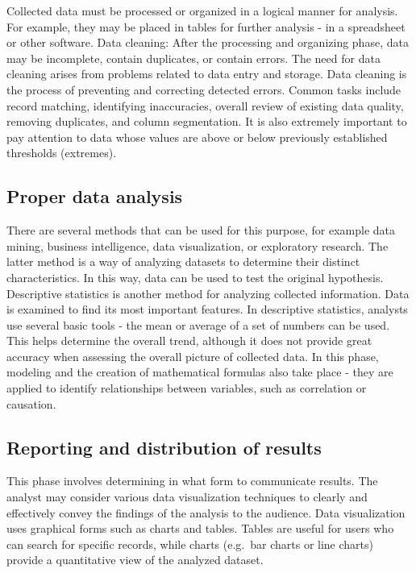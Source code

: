 \documentclass[
  english,
  letterpaper,
  DIV=11,
  numbers=noendperiod]{scrreprt}
\begin{document}
Collected data must be processed or organized in a logical manner for
analysis. For example, they may be placed in tables for further analysis
- in a spreadsheet or other software. Data cleaning: After the
processing and organizing phase, data may be incomplete, contain
duplicates, or contain errors. The need for data cleaning arises from
problems related to data entry and storage. Data cleaning is the process
of preventing and correcting detected errors. Common tasks include
record matching, identifying inaccuracies, overall review of existing
data quality, removing duplicates, and column segmentation. It is also
extremely important to pay attention to data whose values are above or
below previously established thresholds (extremes).

\subsection{Proper data analysis}\label{proper-data-analysis}

There are several methods that can be used for this purpose, for example
data mining, business intelligence, data visualization, or exploratory
research. The latter method is a way of analyzing datasets to determine
their distinct characteristics. In this way, data can be used to test
the original hypothesis. Descriptive statistics is another method for
analyzing collected information. Data is examined to find its most
important features. In descriptive statistics, analysts use several
basic tools - the mean or average of a set of numbers can be used. This
helps determine the overall trend, although it does not provide great
accuracy when assessing the overall picture of collected data. In this
phase, modeling and the creation of mathematical formulas also take
place - they are applied to identify relationships between variables,
such as correlation or causation.

\subsection{Reporting and distribution of
results}\label{reporting-and-distribution-of-results}

This phase involves determining in what form to communicate results. The
analyst may consider various data visualization techniques to clearly
and effectively convey the findings of the analysis to the audience.
Data visualization uses graphical forms such as charts and tables.
Tables are useful for users who can search for specific records, while
charts (e.g.~bar charts or line charts) provide a quantitative view of
the analyzed dataset.
\end{document}

